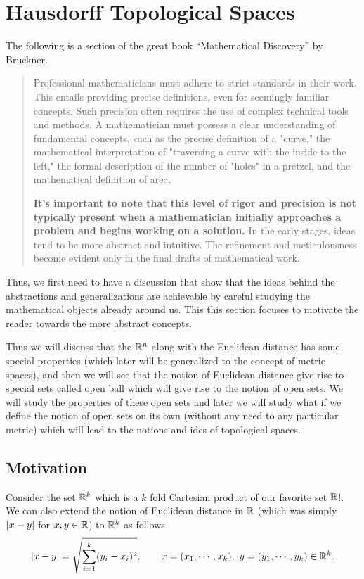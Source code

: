 \chapter{Hausdorff Topological Spaces}



The following is a section of the great book ``Mathematical Discovery'' by Bruckner.
\begin{quote}
	Professional mathematicians must adhere to strict standards in their work. This entails providing precise definitions, even for seemingly familiar concepts. Such precision often requires the use of complex technical tools and methods. A mathematician must possess a clear understanding of fundamental concepts, such as the precise definition of a "curve," the mathematical interpretation of "traversing a curve with the inside to the left," the formal description of the number of "holes" in a pretzel, and the mathematical definition of area.
	
	\textbf{	It's important to note that this level of rigor and precision is not typically present when a mathematician initially approaches a problem and begins working on a solution.} In the early stages, ideas tend to be more abstract and intuitive. The refinement and meticulousness become evident only in the final drafts of mathematical work.
\end{quote}

Thus, we first need to have a discussion that show that the ideas behind the abstractions and generalizations are achievable by careful studying the mathematical objects already around us. This this section focuses to motivate the reader towards the more abstract concepts.

Thus we will discuss that the $\mathbb{R}^n$ along with the Euclidean distance has some special properties (which later will be generalized to the concept of metric spaces), and then we will see that the notion of Euclidean distance give rise to special sets called open ball which will give rise to the notion of open sets. We will study the properties of these open sets and later we will study what if we define the notion of open sets on its own (without any need to any particular metric) which will lead to the notions and ides of topological spaces. 

\section{Motivation}
Consider the set $\mathbb{R}^k$ which is a $k$ fold Cartesian product of our favorite set $\mathbb{R}$!. We can also extend the notion of Euclidean distance in $\mathbb{R}$ (which was simply $|x-y|$ for $x,y\in\mathbb{R}$) to $\mathbb{R}^k$ as follows
\[ |x-y| = \sqrt{\sum_{i=1}^{k} (y_i - x_i)^2}, \qquad x=(x_1,\cdots,x_k),\ y=(y_1,\cdots,y_k) \in \mathbb{R}^k. \]

